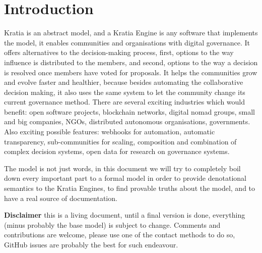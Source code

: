 \section{Introduction}

Kratia is an abstract model, and a Kratia Engine is any software that implements the model, it enables communities and organisations with digital governance. It offers alternatives to the decision-making process, first, options to the way influence is distributed to the members, and second, options to the way a decision is resolved once members have voted for proposals. It helps the communities grow and evolve faster and healthier, because besides automating the collaborative decision making, it also uses the same system to let the community change its current governance method.
There are several exciting industries which would benefit: open software projects, blockchain networks, digital nomad groups, small and big companies, NGOs, distributed autonomous organisations, governments. Also exciting possible features: webhooks for automation, automatic transparency, sub-communities for scaling, composition and combination of complex decision systems, open data for research on governance systems.

The model is not just words, in this document we will try to completely boil down every important part to a formal model in order to provide denotational semantics to the Kratia Engines, to find provable truths about the model, and to have a real source of documentation.

\textbf{Disclaimer} this is a living document, until a final version is done, everything (minus probably the base model) is subject to change. Comments and contributions are welcome, please use one of the contact methods to do so, GitHub issues are probably the best for such endeavour.